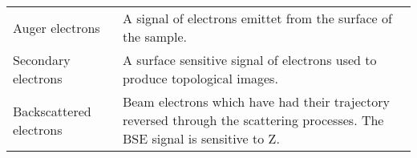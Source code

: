 \begin{table}[phb]
\begin{center}
\begin{tabular}{p{4cm}p{10.6cm}}
            Auger electrons                     & A signal of electrons emittet from the surface of the sample.                                                                                                                                              \\
            Secondary electrons                 & A surface sensitive signal of electrons used to produce topological images.                                                                                                                              \\
            Backscattered electrons             & Beam electrons which have had their trajectory reversed through the scattering processes. The BSE signal is sensitive to Z.                                                                                                       \\
            \hline
        \end{tabular}
    \end{center}
\end{table}